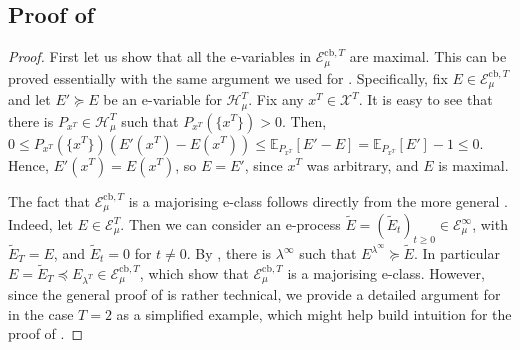\documentclass[3p, authoryear, 10pt]{elsarticle}%
\newcommand{\E}{\mathbb E}
\newcommand{\EcbT}{\mathcal E^{\mathrm{cb},T}}
\newcommand{\Ee}{\mathcal E}
\newcommand{\Hh}{\mathcal H}
\newcommand{\X}{\mathcal X}
\begin{document}
\subsection[Proof of Theorem 2]{Proof of }\label{app:multi}
\begin{proof}
    First let us show that all the e-variables in $\EcbT_\mu$ are maximal. This can be proved essentially with the same argument we used for . Specifically, fix $E\in\mathcal E^{\mathrm{cb},T}_\mu$ and let $E'\succeq E$ be an e-variable for $\Hh_\mu^T$. Fix any $x^T\in\X^T$. It is easy to see that there is $P_{x^T}\in\Hh_\mu^T$ such that $P_{x^T}(\{x^T\})>0$. Then, $0\leq P_{x^T}(\{x^T\})( E'(x^T)-E(x^T) )\leq \E_{P_{x^T}}[E'-E] = \E_{P_{x^T}}[E']-1\leq 0$. Hence, $E'(x^T) = E(x^T)$, so $E=E'$, since $x^T$ was arbitrary, and $E$ is maximal. 

    The fact that $\EcbT_\mu$ is a majorising e-class follows directly from the more general . Indeed, let $E\in\Ee_\mu^T$. Then we can consider an e-process $\tilde E = (\tilde E_t)_{t\geq 0}\in\Ee_\mu^\infty$, with $\tilde E_T = E$, and $\tilde E_t = 0$ for $t\neq 0$. By , there is $\lambda^\infty$ such that $E^{\lambda^\infty}\succeq \tilde E$. In particular $E = \tilde E_T \preceq E_{\lambda^T}\in\EcbT_\mu$, which show that $\EcbT_\mu$ is a majorising e-class.  However, since the general proof of  is rather technical, we provide a detailed argument for  in the case $T=2$ as a simplified example, which might help build intuition for the proof of .


\end{proof}
\end{document}
